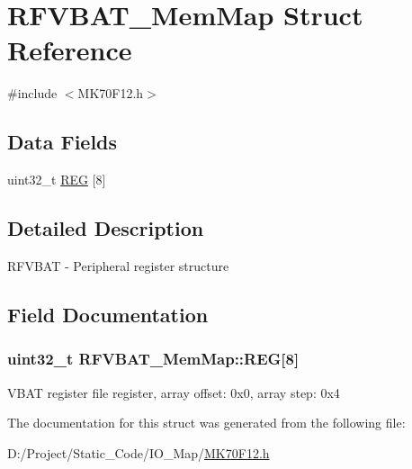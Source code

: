 \hypertarget{struct_r_f_v_b_a_t___mem_map}{}\section{R\+F\+V\+B\+A\+T\+\_\+\+Mem\+Map Struct Reference}
\label{struct_r_f_v_b_a_t___mem_map}


{\ttfamily \#include $<$M\+K70\+F12.\+h$>$}

\subsection*{Data Fields}
\begin{DoxyCompactItemize}
\item 
uint32\+\_\+t \hyperlink{struct_r_f_v_b_a_t___mem_map_a21ddc52aa162e182f22011520b5bf93b}{R\+E\+G} \mbox{[}8\mbox{]}
\end{DoxyCompactItemize}


\subsection{Detailed Description}
R\+F\+V\+B\+A\+T -\/ Peripheral register structure 

\subsection{Field Documentation}
\hypertarget{struct_r_f_v_b_a_t___mem_map_a21ddc52aa162e182f22011520b5bf93b}{}
\subsubsection[{R\+E\+G}]{\setlength{\rightskip}{0pt plus 5cm}uint32\+\_\+t R\+F\+V\+B\+A\+T\+\_\+\+Mem\+Map\+::\+R\+E\+G\mbox{[}8\mbox{]}}\label{struct_r_f_v_b_a_t___mem_map_a21ddc52aa162e182f22011520b5bf93b}
V\+B\+A\+T register file register, array offset\+: 0x0, array step\+: 0x4 

The documentation for this struct was generated from the following file\+:\begin{DoxyCompactItemize}
\item 
D\+:/\+Project/\+Static\+\_\+\+Code/\+I\+O\+\_\+\+Map/\hyperlink{_m_k70_f12_8h}{M\+K70\+F12.\+h}\end{DoxyCompactItemize}
